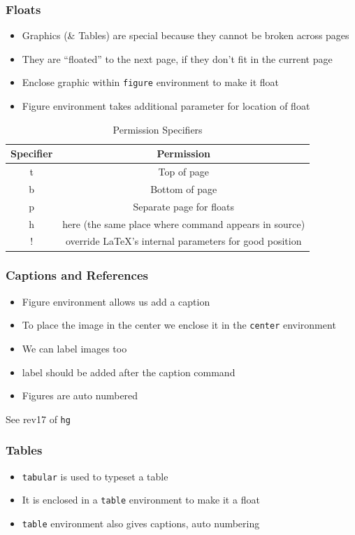 \documentclass{beamer}
\newcommand{\typ}[1]{\lstinline{#1}}
\begin{document}
\begin{frame}[fragile]
  \frametitle{Floats}
  \begin{itemize}
  \item Graphics (\& Tables) are special because they cannot be broken
    across pages 
  \item They are ``floated'' to the next page, if they don't fit in
    the current page 
  \item Enclose graphic within \lstinline+figure+ environment to make
    it float 
  \item Figure environment takes additional parameter for location of
    float 
  \end{itemize}
  \begin{table}
    \caption{Permission Specifiers}
    
    \begin{tabular}{|c|c|}
      Specifier & Permission\\\hline
      t & Top of page\\
      b & Bottom of page\\
      p & Separate page for floats\\
      h & here (the same place where command appears in source)\\
      ! & override \LaTeX's internal parameters for good position
    \end{tabular}
  \end{table}
\end{frame}

\begin{frame}
  \frametitle{Captions and References}
  \begin{itemize}
  \item Figure environment allows us add a caption
  \item To place the image in the center we enclose it in the
    \lstinline+center+ environment 
  \item We can label images too
  \item label should be added after the caption command
  \item Figures are auto numbered
  \end{itemize}
  \tiny See rev17 of \typ{hg}
\end{frame}

\begin{frame}[frame]
  \frametitle{Tables}
  \begin{itemize}
  \item \lstinline+tabular+ is used to typeset a table
  \item It is enclosed in a \lstinline+table+ environment to make it a
    float 
  \item \lstinline+table+ environment also gives captions, auto
    numbering  
  \end{itemize}
\end{frame}
\end{document}
